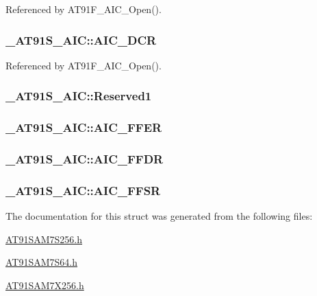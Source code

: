 Referenced by AT91F\_\-AIC\_\-Open().\hypertarget{struct__AT91S__AIC_d50d494de6fc6381f1f98ca95019f2a4}{
\subsubsection{ {\bf \_\-AT91S\_\-AIC::AIC\_\-DCR}}}
\label{struct__AT91S__AIC_d50d494de6fc6381f1f98ca95019f2a4}




Referenced by AT91F\_\-AIC\_\-Open().\hypertarget{struct__AT91S__AIC_2db6d3cdd632cfa69686b5186e47b9de}{
\subsubsection{ {\bf \_\-AT91S\_\-AIC::Reserved1}}}
\label{struct__AT91S__AIC_2db6d3cdd632cfa69686b5186e47b9de}


\hypertarget{struct__AT91S__AIC_d0b62db4d5490f3f3868fc10e36d300c}{
\subsubsection{ {\bf \_\-AT91S\_\-AIC::AIC\_\-FFER}}}
\label{struct__AT91S__AIC_d0b62db4d5490f3f3868fc10e36d300c}


\hypertarget{struct__AT91S__AIC_f9790a9208a6ae1554938439df1872d3}{
\subsubsection{ {\bf \_\-AT91S\_\-AIC::AIC\_\-FFDR}}}
\label{struct__AT91S__AIC_f9790a9208a6ae1554938439df1872d3}


\hypertarget{struct__AT91S__AIC_c3170bea6bdb66db30d2c0aea2d6e262}{
\subsubsection{ {\bf \_\-AT91S\_\-AIC::AIC\_\-FFSR}}}
\label{struct__AT91S__AIC_c3170bea6bdb66db30d2c0aea2d6e262}




The documentation for this struct was generated from the following files:\begin{CompactItemize}
\item 
\hyperlink{AT91SAM7S256_8h}{AT91SAM7S256.h}\item 
\hyperlink{AT91SAM7S64_8h}{AT91SAM7S64.h}\item 
\hyperlink{AT91SAM7X256_8h}{AT91SAM7X256.h}\end{CompactItemize}
